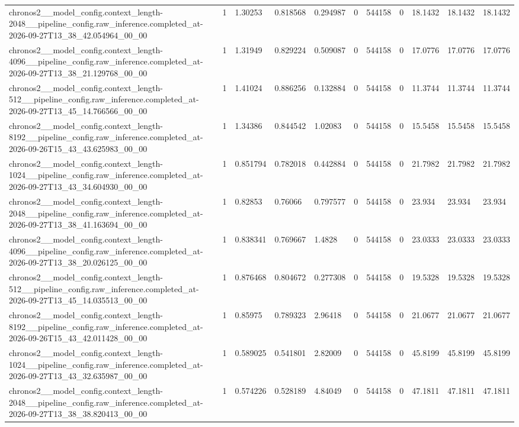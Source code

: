 \begin{tabular}{lllllllllll}
chronos2\_\_model\_config.context\_length-2048\_\_pipeline\_config.raw\_inference.completed\_at-2026-09-27T13\_38\_42.054964\_00\_00 & 1 & 1.30253 & 0.818568 & 0.294987 & 0 & 544158 & 0 & 18.1432 & 18.1432 & 18.1432 \\
chronos2\_\_model\_config.context\_length-4096\_\_pipeline\_config.raw\_inference.completed\_at-2026-09-27T13\_38\_21.129768\_00\_00 & 1 & 1.31949 & 0.829224 & 0.509087 & 0 & 544158 & 0 & 17.0776 & 17.0776 & 17.0776 \\
chronos2\_\_model\_config.context\_length-512\_\_pipeline\_config.raw\_inference.completed\_at-2026-09-27T13\_45\_14.766566\_00\_00 & 1 & 1.41024 & 0.886256 & 0.132884 & 0 & 544158 & 0 & 11.3744 & 11.3744 & 11.3744 \\
chronos2\_\_model\_config.context\_length-8192\_\_pipeline\_config.raw\_inference.completed\_at-2026-09-26T15\_43\_43.625983\_00\_00 & 1 & 1.34386 & 0.844542 & 1.02083 & 0 & 544158 & 0 & 15.5458 & 15.5458 & 15.5458 \\
chronos2\_\_model\_config.context\_length-1024\_\_pipeline\_config.raw\_inference.completed\_at-2026-09-27T13\_43\_34.604930\_00\_00 & 1 & 0.851794 & 0.782018 & 0.442884 & 0 & 544158 & 0 & 21.7982 & 21.7982 & 21.7982 \\
chronos2\_\_model\_config.context\_length-2048\_\_pipeline\_config.raw\_inference.completed\_at-2026-09-27T13\_38\_41.163694\_00\_00 & 1 & 0.82853 & 0.76066 & 0.797577 & 0 & 544158 & 0 & 23.934 & 23.934 & 23.934 \\
chronos2\_\_model\_config.context\_length-4096\_\_pipeline\_config.raw\_inference.completed\_at-2026-09-27T13\_38\_20.026125\_00\_00 & 1 & 0.838341 & 0.769667 & 1.4828 & 0 & 544158 & 0 & 23.0333 & 23.0333 & 23.0333 \\
chronos2\_\_model\_config.context\_length-512\_\_pipeline\_config.raw\_inference.completed\_at-2026-09-27T13\_45\_14.035513\_00\_00 & 1 & 0.876468 & 0.804672 & 0.277308 & 0 & 544158 & 0 & 19.5328 & 19.5328 & 19.5328 \\
chronos2\_\_model\_config.context\_length-8192\_\_pipeline\_config.raw\_inference.completed\_at-2026-09-26T15\_43\_42.011428\_00\_00 & 1 & 0.85975 & 0.789323 & 2.96418 & 0 & 544158 & 0 & 21.0677 & 21.0677 & 21.0677 \\
chronos2\_\_model\_config.context\_length-1024\_\_pipeline\_config.raw\_inference.completed\_at-2026-09-27T13\_43\_32.635987\_00\_00 & 1 & 0.589025 & 0.541801 & 2.82009 & 0 & 544158 & 0 & 45.8199 & 45.8199 & 45.8199 \\
chronos2\_\_model\_config.context\_length-2048\_\_pipeline\_config.raw\_inference.completed\_at-2026-09-27T13\_38\_38.820413\_00\_00 & 1 & 0.574226 & 0.528189 & 4.84049 & 0 & 544158 & 0 & 47.1811 & 47.1811 & 47.1811 \\

\end{tabular}
